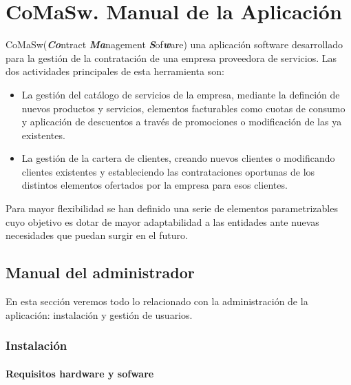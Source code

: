 \chapter{CoMaSw. Manual de la Aplicación}
\label{chap:manual}

\lettrine{CoMaSw} (\emph{\textbf{Co}}ntract \emph{\textbf{Ma}}nagement \emph{\textbf{S}}of\emph{\textbf{w}}are) una aplicación software desarrollado para la gestión de la contratación de una empresa proveedora de servicios. Las dos actividades principales de esta herramienta son:
\begin{itemize}
\item La gestión del catálogo de servicios de la empresa, mediante la definción de nuevos productos y servicios, elementos facturables como cuotas de consumo y aplicación de descuentos a través de promociones o modificación de las ya existentes.
\item La gestión de la cartera de clientes, creando nuevos clientes o modificando clientes existentes y estableciendo las contrataciones oportunas de los distintos elementos ofertados por la empresa para esos clientes.
\end{itemize}

Para mayor flexibilidad se han definido una serie de elementos parametrizables cuyo objetivo es dotar de mayor adaptabilidad a las entidades ante nuevas necesidades que puedan surgir en el futuro.




\section{Manual del administrador}
\label{sec:manual-administrador}

En esta sección veremos todo lo relacionado con la administración de la aplicación: instalación y gestión de usuarios.

\subsection{Instalación}
\label{sub:instalacion}

\subsubsection{Requisitos hardware y sofware}
\label{sub:requisitos}

